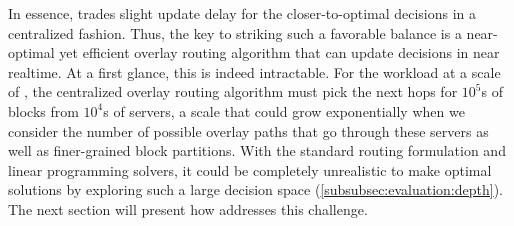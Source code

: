 In essence, \name trades slight update delay for the closer-to-optimal 
decisions in a centralized fashion. Thus, the key to striking such a 
favorable balance is a near-optimal yet efficient overlay routing 
algorithm that can update decisions in near realtime. At a first 
glance, this is indeed intractable. For the workload at a scale of 
\company, the centralized overlay routing algorithm must pick the next 
hops for $10^5$s of blocks from $10^4$s of servers, a scale that 
could grow exponentially when we consider the number of possible 
overlay paths that go through these servers as well as finer-grained 
block partitions. With the standard routing formulation and linear 
programming solvers, it could be completely unrealistic to make 
optimal solutions by exploring such a large decision space 
(\Section\ref{subsubsec:evaluation:depth}).
The next section will present how \name addresses this challenge.




